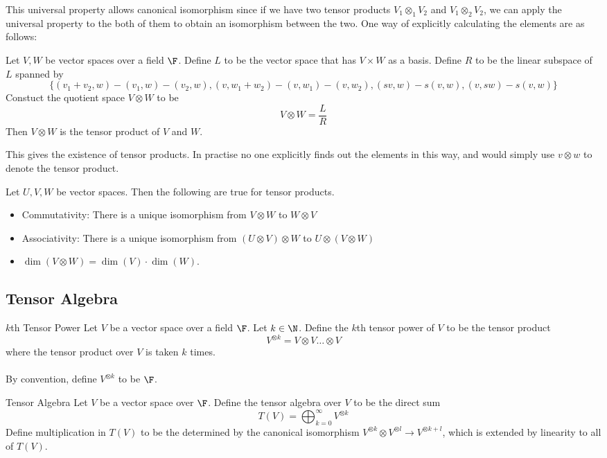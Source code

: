 \documentclass[a4paper]{article}
\begin{document}
This universal property allows canonical isomorphism since if we have two tensor products $V_1\otimes_1 V_2$ and $V_1\otimes_2 V_2$, we can apply the universal property to the both of them to obtain an isomorphism between the two. One way of explicitly calculating the elements are as follows: 

\begin{prp}{}{} Let $V,W$ be vector spaces over a field $\F$. Define $L$ to be the vector space that has $V\times W$ as a basis. Define $R$ to be the linear subspace of $L$ spanned by $$\{(v_1+v_2,w)-(v_1,w)-(v_2,w),(v,w_1+w_2)-(v,w_1)-(v,w_2),(sv,w)-s(v,w),(v,sw)-s(v,w)\}$$ Constuct the quotient space $V\otimes W$ to be $$V\otimes W=\frac{L}{R}$$ Then $V\otimes W$ is the tensor product of $V$ and $W$. 
\end{prp}

This gives the existence of tensor products. In practise no one explicitly finds out the elements in this way, and would simply use $v\otimes w$ to denote the tensor product. 

\begin{prp}{}{} Let $U,V,W$ be vector spaces. Then the following are true for tensor products. 
\begin{itemize}
\item Commutativity: There is a unique isomorphism from $V\otimes W$ to $W\otimes V$
\item Associativity: There is a unique isomorphism from $(U\otimes V)\otimes W$ to $U\otimes(V\otimes W)$
\item $\dim(V\otimes W)=\dim(V)\cdot\dim(W)$. 
\end{itemize}
\end{prp}

\subsection{Tensor Algebra}
\begin{defn}{$k$th Tensor Power}{} Let $V$ be a vector space over a field $\F$. Let $k\in\N$. Define the $k$th tensor power of $V$ to be the tensor product $$V^{\otimes k}=V\otimes V\dots\otimes V$$ where the tensor product over $V$ is taken $k$ times. \\~\\
By convention, define $V^{\otimes k}$ to be $\F$. 
\end{defn}

\begin{defn}{Tensor Algebra}{} Let $V$ be a vector space over $\F$. Define the tensor algebra over $V$ to be the direct sum $$T(V)=\bigoplus_{k=0}^\infty V^{\otimes k}$$ Define multiplication in $T(V)$ to be the determined by the canonical isomorphism $V^{\otimes k}\otimes V^{\otimes l}\to V^{\otimes k+l}$, which is extended by linearity to all of $T(V)$. 
\end{defn}
\end{document}

